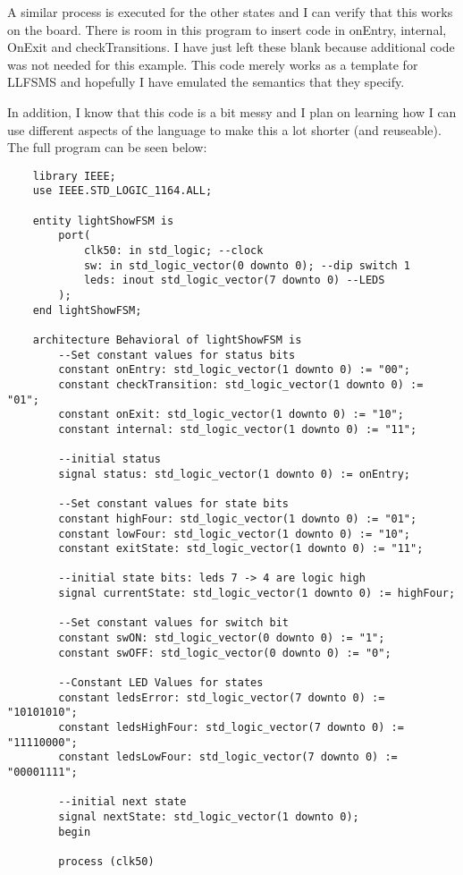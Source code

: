 \documentclass{article}
\begin{document}
	A similar process is executed for the other states and I can verify that this works on the board. There is room in this program to insert code in onEntry, internal, OnExit and checkTransitions. I have just left these blank because additional code was not needed for this example. This code merely works as a template for LLFSMS and hopefully I have emulated the semantics that they specify.
	
	In addition, I know that this code is a bit messy and I plan on learning how I can use different aspects of the language to make this a lot shorter (and reuseable). The full program can be seen below:
	
	\begin{lstlisting}
	library IEEE;
	use IEEE.STD_LOGIC_1164.ALL;
	
	entity lightShowFSM is
		port(
			clk50: in std_logic; --clock
			sw: in std_logic_vector(0 downto 0); --dip switch 1
			leds: inout std_logic_vector(7 downto 0) --LEDS
		);
	end lightShowFSM;
	
	architecture Behavioral of lightShowFSM is
		--Set constant values for status bits
		constant onEntry: std_logic_vector(1 downto 0) := "00";
		constant checkTransition: std_logic_vector(1 downto 0) := "01";
		constant onExit: std_logic_vector(1 downto 0) := "10";
		constant internal: std_logic_vector(1 downto 0) := "11";
	
		--initial status
		signal status: std_logic_vector(1 downto 0) := onEntry;
		
		--Set constant values for state bits
		constant highFour: std_logic_vector(1 downto 0) := "01";
		constant lowFour: std_logic_vector(1 downto 0) := "10";
		constant exitState: std_logic_vector(1 downto 0) := "11";
		
		--initial state bits: leds 7 -> 4 are logic high
		signal currentState: std_logic_vector(1 downto 0) := highFour;
		
		--Set constant values for switch bit
		constant swON: std_logic_vector(0 downto 0) := "1";
		constant swOFF: std_logic_vector(0 downto 0) := "0";
		
		--Constant LED Values for states
		constant ledsError: std_logic_vector(7 downto 0) := "10101010";
		constant ledsHighFour: std_logic_vector(7 downto 0) := "11110000";
		constant ledsLowFour: std_logic_vector(7 downto 0) := "00001111";
		
		--initial next state
		signal nextState: std_logic_vector(1 downto 0);
		begin
		
		process (clk50)
		

\end{lstlisting}
\end{document}

